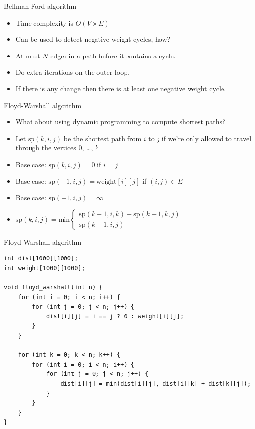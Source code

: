 \documentclass{beamer}
\begin{document}
\begin{frame}[plain]{Bellman-Ford algorithm}
    \begin{itemize}
        \item Time complexity is $O(V\times E)$
        \vspace{10pt}
        \item Can be used to detect negative-weight cycles, how?
        \item <2-> At most $N$ edges in a path before it contains a cycle.
        \item <3-> Do extra iterations on the outer loop.
        \item <4-> If there is any change then there is at least one negative weight cycle.
    \end{itemize}
\end{frame}

\begin{frame}[plain]{Floyd-Warshall algorithm}
    \begin{itemize}
        \item What about using dynamic programming to compute shortest paths?
        \vspace{10pt}
    \item Let $\mathrm{sp}(k, i, j)$ be the shortest path from $i$ to $j$ if we're only allowed to travel through the vertices $0$, \ldots, $k$
        \vspace{5pt}
    \item Base case: $\mathrm{sp}(k, i, j) = 0$ if $i = j$
    \item Base case: $\mathrm{sp}(-1, i, j) = \mathrm{weight}[i][j]$ if $(i,j) \in E$
    \item Base case: $\mathrm{sp}(-1, i, j) = \infty$
        \vspace{5pt}
    \item $\mathrm{sp}(k, i, j) = \mathrm{min} \left\{
	\begin{array}{l}
        \mathrm{sp}(k - 1, i, k) + \mathrm{sp}(k - 1, k, j) \\
        \mathrm{sp}(k - 1, i, j)
	\end{array}
\right.$
    \end{itemize}
\end{frame}

\begin{frame}{Floyd-Warshall algorithm}
    \begin{verbatim}
int dist[1000][1000];
int weight[1000][1000];

void floyd_warshall(int n) {
    for (int i = 0; i < n; i++) {
        for (int j = 0; j < n; j++) {
            dist[i][j] = i == j ? 0 : weight[i][j];
        }
    }

    for (int k = 0; k < n; k++) {
        for (int i = 0; i < n; i++) {
            for (int j = 0; j < n; j++) {
                dist[i][j] = min(dist[i][j], dist[i][k] + dist[k][j]);
            }
        }
    }
}
    \end{verbatim}
\end{frame}
\end{document}
